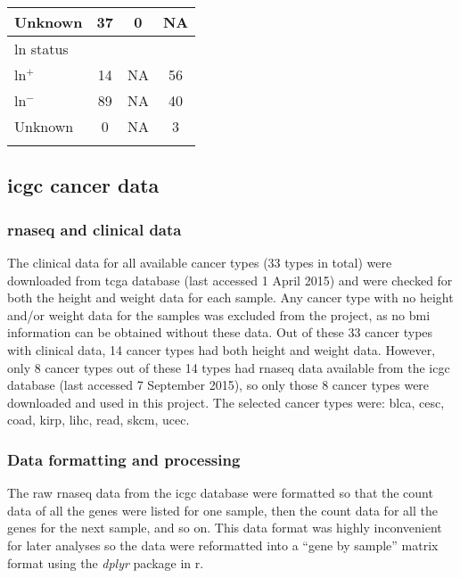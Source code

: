 \begin{ThreePartTable}
\begin{longtable}{lccc}
		\hspace{1em} Unknown                 & 37 & 0 & NA \\
		\hline
		\rule{0pt}{2.25ex}\gls{ln} status   \\
		\hspace{1em} \gls{ln}$^+$            & 14 & NA & 56\\
		\hspace{1em} \gls{ln}$^-$            & 89 & NA & 40\\
		\hspace{1em} Unknown                 & 0  & NA & 3 \\
		\hline
		\hline
		\insertTableNotes
	\end{longtable}
\end{ThreePartTable}

\subsection{\gls{icgc} cancer data}
\label{sub:icgc_cancer_data}

\subsubsection{\gls{rnaseq} and clinical data}
\label{ssub:rnaseq_and_clinical_data}

The clinical data for all available cancer types (33 types in total) were downloaded from \gls{tcga} database (last accessed 1 April 2015) and were checked for both the height and weight data for each sample.
Any cancer type with no height and/or weight data for the samples was excluded from the project, as no \gls{bmi} information can be obtained without these data.
Out of these 33 cancer types with clinical data, 14 cancer types had both height and weight data.
However, only 8 cancer types out of these 14 types had \gls{rnaseq} data available from the \gls{icgc} database (last accessed 7 September 2015), so only those 8 cancer types were downloaded and used in this project.
The selected cancer types were: \gls{blca}, \gls{cesc}, \gls{coad}, \gls{kirp}, \gls{lihc}, \gls{read}, \gls{skcm}, \gls{ucec}.

\subsubsection{Data formatting and processing}
\label{ssub:data_formatting_and_processing}

The raw \gls{rnaseq} data from the \gls{icgc} database were formatted so that the count data of all the genes were listed for one sample, then the count data for all the genes for the next sample, and so on.
This data format was highly inconvenient for later analyses so the data were reformatted into a ``gene by sample'' matrix format using the \textit{dplyr} package in \gls{r}.

